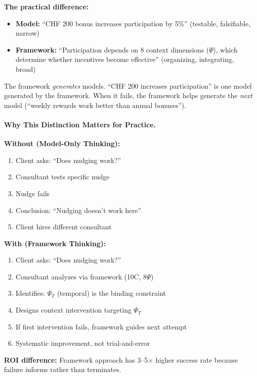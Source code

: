 \textbf{The practical difference:}
\begin{itemize}[nosep]
    \item \textbf{Model:} ``CHF 200 bonus increases participation by 5\%'' (testable, falsifiable, narrow)
    \item \textbf{Framework:} ``Participation depends on 8 context dimensions ($\Psi$), which determine whether incentives become effective'' (organizing, integrating, broad)
\end{itemize}

The framework \textit{generates} models. ``CHF 200 increases participation'' is one model generated by the framework. When it fails, the framework helps generate the \textit{next} model (``weekly rewards work better than annual bonuses'').

\paragraph{Why This Distinction Matters for Practice.}

\begin{tcolorbox}[colback=blue!5!white, colframe=blue!75!black,
    title=\textbf{Without vs.\ With the Distinction}]

\textbf{Without (Model-Only Thinking):}
\begin{enumerate}[nosep]
    \item Client asks: ``Does nudging work?''
    \item Consultant tests specific nudge
    \item Nudge fails
    \item Conclusion: ``Nudging doesn't work here''
    \item Client hires different consultant
\end{enumerate}

\textbf{With (Framework Thinking):}
\begin{enumerate}[nosep]
    \item Client asks: ``Does nudging work?''
    \item Consultant analyzes via framework (10C, 8$\Psi$)
    \item Identifies: $\Psi_T$ (temporal) is the binding constraint
    \item Designs context intervention targeting $\Psi_T$
    \item If first intervention fails, framework guides next attempt
    \item Systematic improvement, not trial-and-error
\end{enumerate}

\textbf{ROI difference:} Framework approach has 3--5$\times$ higher success rate because failure informs rather than terminates.

\end{tcolorbox}


